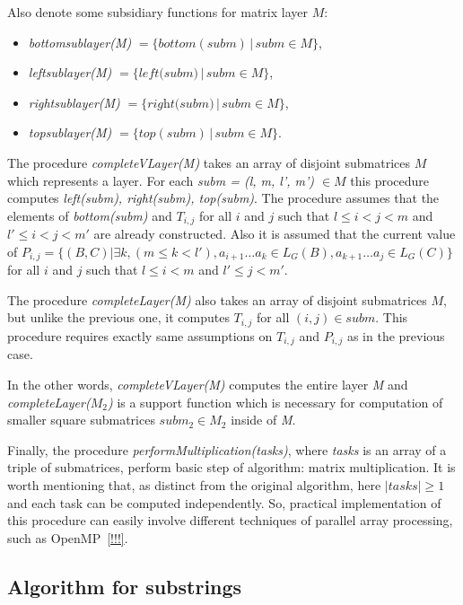 Also denote some subsidiary functions for matrix layer $M$:
 \begin{itemize}
  \item \textit{bottomsublayer(M)} $ = \{bottom(subm)\, |\,subm \in M \}$,
  \item \textit{leftsublayer(M)} $ = \{\textit{left(subm)}\, |\,subm \in M \}$,
  \item \textit{rightsublayer(M)} $ =\{\textit{right(subm)}\, |\,subm \in M \}$,
  \item \textit{topsublayer(M)} $ = \{top(subm)\, |\,subm \in M \}$.
\end{itemize}



The procedure \textit{completeVLayer(M)} takes an array of disjoint submatrices $M$ which represents a layer.
For each \textit{subm = (l, m, l', m') $\in M$} this procedure computes \textit{left(subm), right(subm), top(subm)}.
The procedure assumes that the elements of \textit{bottom(subm)} and $T_{i, j}$ for all $i$ and $j$ such that $l \leq i < j < m$ and $  l' \leq i < j < m'$ are already constructed.
Also it is assumed that the current value of
$P_{i, j} =  \{ (B, C) | \exists k, (m \le k < l'), a_{i + 1} \dots a_{k} \in L_G(B), a_{k + 1} \dots a_{j} \in L_G(C)\} $ for all $i$ and $j$ such that $l \leq i < m$ and $l' \leq j < m'$.

The procedure \textit{completeLayer(M)} also takes an array of disjoint submatrices $M$, but unlike the previous one, it computes $T_{i, j}$ for all $(i, j) \in subm$.
This procedure requires exactly same assumptions on $T_{i, j}$  and $P_{i, j}$  as in the previous case.

In the other words, \textit{completeVLayer(M)} computes the entire layer \textit{M} \linebreak and \textit{completeLayer($M_{2}$)} is a support function which is necessary for computation of smaller square submatrices $subm_{2} \in M_{2}$ inside of \textit{M}.  

Finally, the procedure \textit{performMultiplication(tasks)}, where \textit{tasks} is an array of a triple of submatrices, perform basic step of algorithm: matrix multiplication. It is worth mentioning that, as distinct from the original algorithm, here $|tasks| \ge 1$ and each task can be computed independently.
So, practical implementation of this procedure can easily involve different techniques of parallel array processing, such as OpenMP~\ref{!!!}.

\subsection{Algorithm for substrings}

